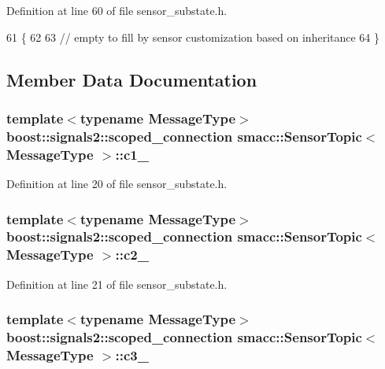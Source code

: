 Definition at line 60 of file sensor\+\_\+substate.\+h.


\begin{DoxyCode}
61   \{
62 
63     \textcolor{comment}{// empty to fill by sensor customization based on inheritance}
64   \}
\end{DoxyCode}


\subsection{Member Data Documentation}
\subsubsection[{\texorpdfstring{c1\+\_\+}{c1_}}]{\setlength{\rightskip}{0pt plus 5cm}template$<$typename Message\+Type$>$ boost\+::signals2\+::scoped\+\_\+connection {\bf smacc\+::\+Sensor\+Topic}$<$ Message\+Type $>$\+::c1\+\_\+}\hypertarget{classsmacc_1_1SensorTopic_a3c27b66b1bd8bc850875d95ad5a41041}{}\label{classsmacc_1_1SensorTopic_a3c27b66b1bd8bc850875d95ad5a41041}


Definition at line 20 of file sensor\+\_\+substate.\+h.

\subsubsection[{\texorpdfstring{c2\+\_\+}{c2_}}]{\setlength{\rightskip}{0pt plus 5cm}template$<$typename Message\+Type$>$ boost\+::signals2\+::scoped\+\_\+connection {\bf smacc\+::\+Sensor\+Topic}$<$ Message\+Type $>$\+::c2\+\_\+}\hypertarget{classsmacc_1_1SensorTopic_a7d93fd46086bf098cf75a12c27976a8e}{}\label{classsmacc_1_1SensorTopic_a7d93fd46086bf098cf75a12c27976a8e}


Definition at line 21 of file sensor\+\_\+substate.\+h.

\subsubsection[{\texorpdfstring{c3\+\_\+}{c3_}}]{\setlength{\rightskip}{0pt plus 5cm}template$<$typename Message\+Type$>$ boost\+::signals2\+::scoped\+\_\+connection {\bf smacc\+::\+Sensor\+Topic}$<$ Message\+Type $>$\+::c3\+\_\+}\hypertarget{classsmacc_1_1SensorTopic_a2e54533c2a0e0daec10eec3f69ff63d6}{}\label{classsmacc_1_1SensorTopic_a2e54533c2a0e0daec10eec3f69ff63d6}



